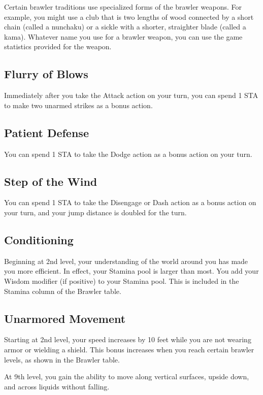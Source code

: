 Certain brawler traditions use specialized forms of the brawler weapons. For example, you might use a club that is two lengths of wood connected by a short chain (called a nunchaku) or a sickle with a shorter, straighter blade (called a kama). Whatever name you use for a brawler weapon, you can use the game statistics provided for the weapon.

\subsection{Flurry of Blows}

Immediately after you take the Attack action on your turn, you can spend 1 STA to make two unarmed strikes as a bonus action.

\subsection{Patient Defense}

You can spend 1 STA to take the Dodge action as a bonus action on your turn.

\subsection{Step of the Wind}

You can spend 1 STA to take the Disengage or Dash action as a bonus action on your turn, and your jump distance is doubled for the turn.

\subsection{Conditioning}
Beginning at 2nd level, your understanding of the world around you has made you more efficient. In effect, your Stamina pool is larger than most. You add your Wisdom modifier (if positive) to your Stamina pool. This is included in the Stamina column of the Brawler table. 

\subsection{Unarmored Movement}

Starting at 2nd level, your speed increases by 10 feet while you are not wearing armor or wielding a shield. This bonus increases when you reach certain brawler levels, as shown in the Brawler table.

At 9th level, you gain the ability to move along vertical surfaces, upside down, and across liquids without falling.

